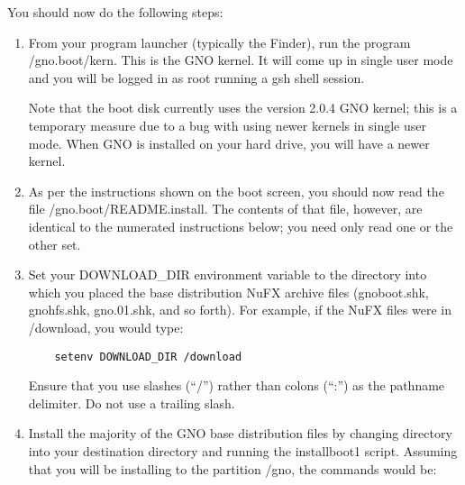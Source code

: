 \documentclass{report}
\begin{document}
You should now do the following steps:

\begin{comment}

If your volumes are named something else, replace the names in the cd commands
below with the appropriate name.
 
\end{comment}


\begin{enumerate}


\item
From your program launcher (typically the Finder), run the program
/gno.boot/kern.
This is the GNO kernel.  It will come up in 
single user mode and you will be logged in as root running a 
gsh
shell session.

Note that the boot disk currently uses the version 2.0.4 GNO kernel; this
is a temporary measure due to a bug with using newer kernels in single user
mode.  When GNO is installed on your hard drive, you will have a newer
kernel.

\item
As per the instructions shown on the boot screen, you should now read the
file /gno.boot/README.install.  The contents of that file, however, are
identical to the numerated instructions below; you need only read one or
the other set.

\item
Set your DOWNLOAD\_DIR environment variable to the directory
into which you placed the base distribution NuFX archive files
(gnoboot.shk, gnohfs.shk, gno.01.shk, and so forth).  For
example, if the NuFX files were in /download, you would type:

\begin{verbatim}
	setenv DOWNLOAD_DIR /download
\end{verbatim}

Ensure that you use slashes (``/'') rather than colons (``:'') as the
pathname delimiter.  Do not use a trailing slash.

\item
Install the majority of the GNO base distribution files by
changing directory into your destination directory and running
the installboot1 script. Assuming that you will be installing
to the partition /gno, the commands would be:


\end{enumerate}
\end{document}
